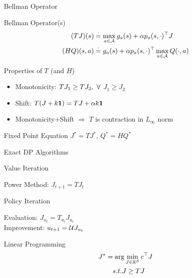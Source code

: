 \documentclass[10pt,handout]{beamer}
\begin{document}
\begin{frame}[fragile]{Bellman Operator}
\begin{block}{Bellman Operator(s)}
\begin{align*}
(TJ)(s)&\stackrel{\cdot}{=}\max_{a\in \mathcal{A}} g_a(s)+\alpha p_a(s,\cdot)^\top J\\
(HQ)(s,a)&\stackrel{\cdot}{=} g_a(s)+\alpha p_a(s,\cdot)^\top \max_{a\in \mathcal{A}}Q(\cdot,a)
\end{align*}
\end{block}
\begin{block}{Properties of $T$ (and $H$)}
\begin{itemize}
\item {Monotonicity:} $T J_1\geq T J_2, \mbox{ } \forall$ $J_1\geq J_2$
\item {Shift:} $T (J+k\mathbf{1})= T J+\alpha k\mathbf{1}$
\item Monotonicity+Shift $\Rightarrow$ $T$ is contraction in $L_\infty$ norm
\end{itemize}
\end{block}
\begin{block}{Fixed Point Equation}
\centering $J^*=TJ^*$, $Q^*=HQ^*$
\end{block}
\end{frame}


\begin{frame}[fragile]{Exact DP Algorithms}
\begin{block}{Value Iteration}
\begin{center}
Power Method: $J_{t+1}=T J_t$
\end{center}
\end{block}
\begin{block}{Policy Iteration}
\begin{center}
Evaluation: $J_{u_t}=T_{u_t} J_{u_t}$\\
Improvement: $u_{t+1}=\mathcal{U} J_{u_t}$
\end{center}
\end{block}

\begin{block}{Linear Programming}
\begin{align*}
J^*&=\arg\min_{J\in \mathbb{R}^{\mathcal{S}}} c^\top J\\
&\quad s.t. J\geq TJ
\end{align*}
\end{block}

\begin{center}
{\color{orange}{Convergent and Exact}}
\end{center}
\end{frame}
\end{document}
